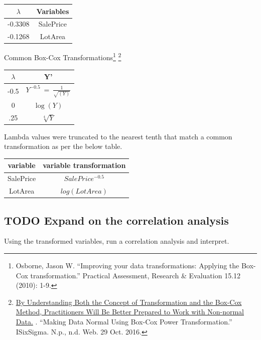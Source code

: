 \documentclass[]{article}
\let\rmarkdownfootnote\footnote%
\def\footnote{\protect\rmarkdownfootnote}
\begin{document}
\begin{longtable}[]{@{}cc@{}}
\toprule
\(\lambda\) & Variables\tabularnewline
\midrule
\endhead
-0.3308 & SalePrice\tabularnewline
-0.1268 & LotArea\tabularnewline
\bottomrule
\end{longtable}

\centering

Common Box-Cox Transformations\footnote{Osborne, Jason W. ``Improving
  your data transformations: Applying the Box-Cox transformation.''
  Practical Assessment, Research \& Evaluation 15.12 (2010): 1-9.}
\footnote{\href{https://www.isixsigma.com/tools-templates/normality/making-data-normal-using-box-cox-power-transformation/}{By
  Understanding Both the Concept of Transformation and the Box-Cox
  Method, Practitioners Will Be Better Prepared to Work with Non-normal
  Data.} . ``Making Data Normal Using Box-Cox Power Transformation.''
  ISixSigma. N.p., n.d. Web. 29 Oct. 2016.}

\setlength{\tabcolsep}{12pt}

\begin{tabular}{ c c }
\hline
$\lambda$ & Y' \\ \hline
-0.5 &  $Y^{-0.5}~=~\frac{1}{\sqrt{(Y)}}$ \\
0   & $\log(Y)$ \\
.25  & $\sqrt[4]{Y}$
\end{tabular}

\justifying

Lambda values were truncated to the nearest tenth that match a common
transformation as per the below table.

\centering

\begin{tabular}{ c c }
\hline
variable & variable transformation \\ \hline
SalePrice & $SalePrice^{-0.5}$ \\
LotArea & $log(LotArea)$ 
\end{tabular}

\justifying

\setlength{\tabcolsep}{6pt}

\subsection{TODO Expand on the correlation
analysis}\label{todo-expand-on-the-correlation-analysis}

Using the transformed variables, run a correlation analysis and
interpret.
\end{document}
